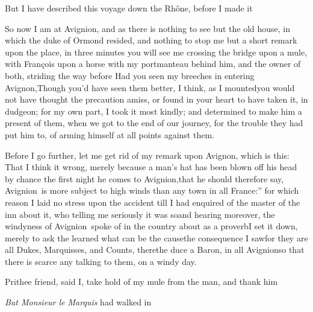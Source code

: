 \documentclass{article}
\begin{document}
But I have described this voyage down the Rhône,
before I made it\tsh

\tsh So now I am at Avignion\sic, and as there is
nothing to see but the old house, in which the duke of
Ormond resided, and nothing to stop me but a short remark
upon the place, in three minutes you will see me crossing the
bridge upon a mule, with François upon a horse with
my portmanteau behind him, and the owner of both, striding the way
before 
Had you
seen my breeches in entering Avignon,\tsh Though
you’d have seen them better, I think, as I mounted\tsk you
would not have thought the precaution amiss, or found in your heart
to have taken it, in dudgeon; for my own part, I took it most
kindly; and determined to make him a present of them, when we got
to the end of our journey, for the trouble they had put him to, of
arming himself at all points against them.

Before I go further, let me get rid of my remark upon
Avignon, which is this: That I think it wrong, merely because a man’s
hat has been blown off his head by chance the first night he comes
to Avig\-nion\sic,\tsh that he should therefore say,\break
\lqq Avignion\sic\ is more subject to high winds than any town
in all France:” for which reason I laid no stress upon
the accident till I had enquired of the master of the inn about it,
who telling me seriously it was so\tsh and hearing
moreover, the windyness of Avignion\sic\ spoke of in the country
about as a proverb\tsh I set it down, merely to ask the
learned what can be the cause\tsh the consequence I
saw\tsk for they are all Dukes, Marquisses, and Counts,
there\tsh the duce a Baron, in all
Avignion\sic\tsh so that there is scarce any talking to
them, on a windy day.

Prithee friend, said I, take hold of my
mule from the man, and thank him\tsh

\tsh \textit{But Monsieur le Marquis} had\break
walked in\tsh
\end{document}
